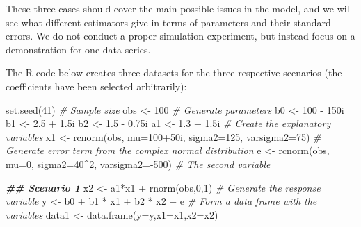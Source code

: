 \documentclass[
]{book}
\newenvironment{Shaded}{\begin{snugshade}}{\end{snugshade}}
\newcommand{\AttributeTok}[1]{\textcolor[rgb]{0.77,0.63,0.00}{#1}}
\newcommand{\CommentTok}[1]{\textcolor[rgb]{0.56,0.35,0.01}{\textit{#1}}}
\newcommand{\DecValTok}[1]{\textcolor[rgb]{0.00,0.00,0.81}{#1}}
\newcommand{\DocumentationTok}[1]{\textcolor[rgb]{0.56,0.35,0.01}{\textbf{\textit{#1}}}}
\newcommand{\FloatTok}[1]{\textcolor[rgb]{0.00,0.00,0.81}{#1}}
\newcommand{\FunctionTok}[1]{\textcolor[rgb]{0.00,0.00,0.00}{#1}}
\newcommand{\NormalTok}[1]{#1}
\newcommand{\OtherTok}[1]{\textcolor[rgb]{0.56,0.35,0.01}{#1}}
\newcommand{\SpecialCharTok}[1]{\textcolor[rgb]{0.00,0.00,0.00}{#1}}
\begin{document}
These three cases should cover the main possible issues in the model, and we will see what different estimators give in terms of parameters and their standard errors. We do not conduct a proper simulation experiment, but instead focus on a demonstration for one data series.

The R code below creates three datasets for the three respective scenarios (the coefficients have been selected arbitrarily):

\begin{Shaded}
\begin{Highlighting}[]
\FunctionTok{set.seed}\NormalTok{(}\DecValTok{41}\NormalTok{)}
\CommentTok{\# Sample size}
\NormalTok{obs }\OtherTok{\textless{}{-}} \DecValTok{100}
\CommentTok{\# Generate parameters}
\NormalTok{b0 }\OtherTok{\textless{}{-}} \DecValTok{100} \SpecialCharTok{{-}}\NormalTok{ 150i}
\NormalTok{b1 }\OtherTok{\textless{}{-}} \FloatTok{2.5} \SpecialCharTok{+} \FloatTok{1.5}\NormalTok{i}
\NormalTok{b2 }\OtherTok{\textless{}{-}} \FloatTok{1.5} \SpecialCharTok{{-}} \FloatTok{0.75}\NormalTok{i}
\NormalTok{a1 }\OtherTok{\textless{}{-}} \FloatTok{1.3} \SpecialCharTok{+} \FloatTok{1.5}\NormalTok{i}
\CommentTok{\# Create the explanatory variables}
\NormalTok{x1 }\OtherTok{\textless{}{-}} \FunctionTok{rcnorm}\NormalTok{(obs, }\AttributeTok{mu=}\DecValTok{100}\SpecialCharTok{+}\NormalTok{50i, }\AttributeTok{sigma2=}\DecValTok{125}\NormalTok{, }\AttributeTok{varsigma2=}\DecValTok{75}\NormalTok{)}
\CommentTok{\# Generate error term from the complex normal distribution}
\NormalTok{e }\OtherTok{\textless{}{-}} \FunctionTok{rcnorm}\NormalTok{(obs, }\AttributeTok{mu=}\DecValTok{0}\NormalTok{, }\AttributeTok{sigma2=}\DecValTok{40}\SpecialCharTok{\^{}}\DecValTok{2}\NormalTok{, }\AttributeTok{varsigma2=}\SpecialCharTok{{-}}\DecValTok{500}\NormalTok{)}
\CommentTok{\# The second variable}

\DocumentationTok{\#\# Scenario 1}
\NormalTok{x2 }\OtherTok{\textless{}{-}}\NormalTok{ a1}\SpecialCharTok{*}\NormalTok{x1 }\SpecialCharTok{+} \FunctionTok{rnorm}\NormalTok{(obs,}\DecValTok{0}\NormalTok{,}\DecValTok{1}\NormalTok{)}
\CommentTok{\# Generate the response variable}
\NormalTok{y }\OtherTok{\textless{}{-}}\NormalTok{ b0 }\SpecialCharTok{+}\NormalTok{ b1 }\SpecialCharTok{*}\NormalTok{ x1 }\SpecialCharTok{+}\NormalTok{ b2 }\SpecialCharTok{*}\NormalTok{ x2 }\SpecialCharTok{+}\NormalTok{ e}
\CommentTok{\# Form a data frame with the variables}
\NormalTok{data1 }\OtherTok{\textless{}{-}} \FunctionTok{data.frame}\NormalTok{(}\AttributeTok{y=}\NormalTok{y,}\AttributeTok{x1=}\NormalTok{x1,}\AttributeTok{x2=}\NormalTok{x2)}


\end{Highlighting}
\end{Shaded}
\end{document}

